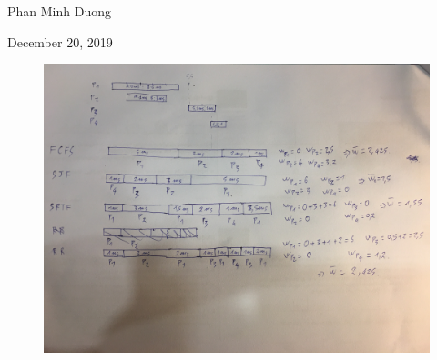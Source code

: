 \documentclass[article, paper=a4, fontsize=11pt]{scrartcl}
\begin{document}
\begin{center}
Phan Minh Duong
\end{center}
\begin{center}
December 20, 2019
\end{center}

\begin{figure}[h!]
 \centering
  \includegraphics[width=\linewidth]{process.JPG}
  \label{fig:boat1}
 
\end{figure}
\end{document}
